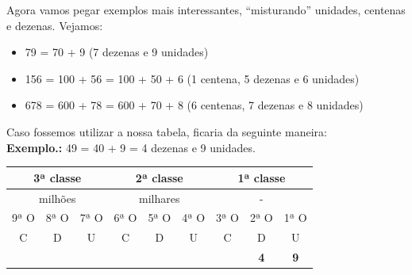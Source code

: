 Agora vamos pegar exemplos mais interessantes, ``misturando'' unidades, centenas e dezenas. Vejamos:

\begin{itemize}
    \item 79 = 70 + 9 (7 dezenas e 9 unidades)
    \item 156 = 100 + 56 = 100 + 50 + 6 (1 centena, 5 dezenas e 6 unidades)
    \item 678 = 600 + 78 = 600 + 70 + 8 (6 centenas, 7 dezenas e 8 unidades)
\end{itemize}

Caso fossemos utilizar a nossa tabela, ficaria da seguinte maneira: \\

\textbf{Exemplo.:} 49 = 40 + 9 = 4 dezenas e 9 unidades.

\begin{table}[H]
\begin{tabular}{|ccc|ccc|ccc|}
\hline
\multicolumn{3}{|c|}{3ª classe} & \multicolumn{3}{c|}{2ª classe}                                                                       & \multicolumn{3}{c|}{1ª classe}                                                                        \\ \hline
\multicolumn{3}{|c|}{milhões}                                                                         & \multicolumn{3}{c|}{milhares}                                                                        & \multicolumn{3}{c|}{-}                                                                                \\ \hline
\multicolumn{1}{|c|}{9ª O}                     & \multicolumn{1}{c|}{8ª O}                     & 7ª O & \multicolumn{1}{c|}{6ª O}                     & \multicolumn{1}{c|}{5ª O}                     & 4ª O & \multicolumn{1}{c|}{3ª O}                     & \multicolumn{1}{c|}{2ª O}                      & 1ª O \\ \hline
\multicolumn{1}{|c|}{C}                        & \multicolumn{1}{c|}{D}                        & U    & \multicolumn{1}{c|}{C}                        & \multicolumn{1}{c|}{D}                        & U    & \multicolumn{1}{c|}{C}                        & \multicolumn{1}{c|}{D}                         & U    \\ \hline
\rowcolor[HTML]{FFFC9E} 
\multicolumn{1}{|c|}{\cellcolor[HTML]{FFFC9E}} & \multicolumn{1}{c|}{\cellcolor[HTML]{FFFC9E}} &      & \multicolumn{1}{c|}{\cellcolor[HTML]{FFFC9E}} & \multicolumn{1}{c|}{\cellcolor[HTML]{FFFC9E}} &      & \multicolumn{1}{c|}{\cellcolor[HTML]{FFFC9E}} & \multicolumn{1}{c|}{\cellcolor[HTML]{FFFC9E}\textbf{4}} & \textbf{9}    \\ \hline
\end{tabular}
\end{table}

